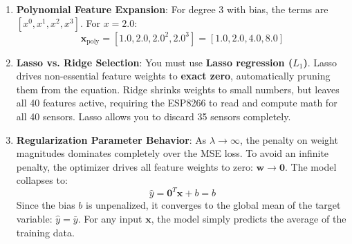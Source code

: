 \begin{enumerate}
    \item \textbf{Polynomial Feature Expansion}:
    For degree 3 with bias, the terms are $[x^0, x^1, x^2, x^3]$.
    For $x = 2.0$:
    \begin{equation*}
    \mathbf{x}_{\text{poly}} = [1.0, 2.0, 2.0^2, 2.0^3] = [\mathbf{1.0, 2.0, 4.0, 8.0}]
    \end{equation*}

    \item \textbf{Lasso vs. Ridge Selection}:
    You must use \textbf{Lasso regression ($L_1$)}. Lasso drives non-essential feature weights to \textbf{exact zero}, automatically pruning them from the equation. Ridge shrinks weights to small numbers, but leaves all 40 features active, requiring the ESP8266 to read and compute math for all 40 sensors. Lasso allows you to discard 35 sensors completely.

    \item \textbf{Regularization Parameter Behavior}:
    As $\lambda \to \infty$, the penalty on weight magnitudes dominates completely over the MSE loss. To avoid an infinite penalty, the optimizer drives all feature weights to zero: $\mathbf{w} \to \mathbf{0}$.
    The model collapses to:
    \begin{equation*}
    \hat{y} = \mathbf{0}^T \mathbf{x} + b = b
    \end{equation*}
    Since the bias $b$ is unpenalized, it converges to the global mean of the target variable: $\hat{y} = \bar{y}$. For any input $\mathbf{x}$, the model simply predicts the average of the training data.
\end{enumerate}
